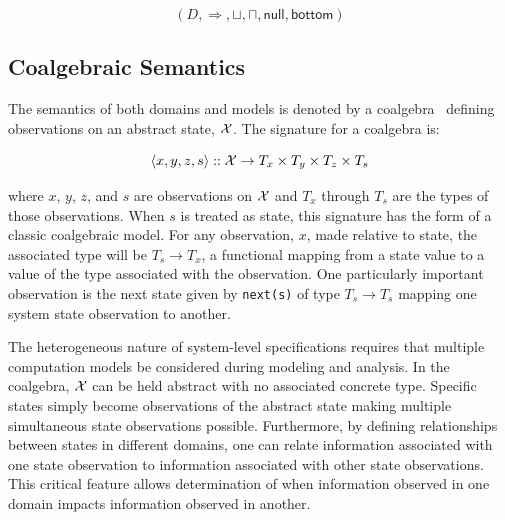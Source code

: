 \documentclass[12pt]{article}
\begin{document}
\[(D,\Rightarrow,\sqcup,\sqcap,\mathsf{null},\mathsf{bottom})\]

\subsection{Coalgebraic Semantics}

The semantics of both domains and models is denoted by a
coalgebra~\cite{Jacobs:97:A-Tutorial-on-C} defining observations on an abstract state,
$\mathcal X$.  The signature for a coalgebra is:

\[\langle x,y,z,s \rangle::\mathcal X \rightarrow
T_x\times T_y\times T_z\times T_s\]


\noindent where $x$, $y$, $z$, and $s$ are observations on $\mathcal X$
and $T_x$ through $T_s$ are the types of those observations.  When $s$
is treated as state, this signature has the form of a classic
coalgebraic model.  For any observation, $x$, made relative to state,
the associated type will be $T_s\rightarrow T_x$, a functional mapping
from a state value to a value of the type associated with the
observation.  One particularly important observation is the next state
given by \lstinline!next(s)! of type $T_s\rightarrow T_s$ mapping one
system state observation to another.


The heterogeneous nature of system-level specifications requires that multiple computation
models be considered during modeling and analysis.  In the coalgebra, $\mathcal X$ can be
held abstract with no associated concrete type.  Specific states simply become
observations of the abstract state making multiple simultaneous state observations
possible.  Furthermore, by defining relationships between states in different domains, one
can relate information associated with one state observation to information associated
with other state observations.  This critical feature allows determination of when
information observed in one domain impacts information observed in another.
\end{document}
